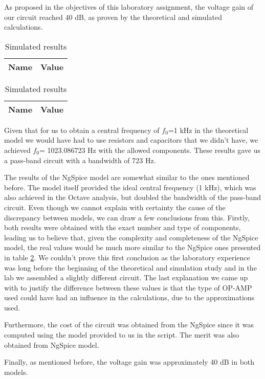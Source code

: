 As proposed in the objectives of this laboratory assignment, the voltage gain of our circuit reached 40 dB, as proven by the theoretical and simulated calculations. 

\begin{table}[H]
\parbox{.5\linewidth}{
\centering                
\def\arraystretch{1}        %

\begin{tabular}{c|c}        %
\hline                      %

\textbf{Name}  & \textbf{Value}\\     
\hline                      %

\hline                      %
\end{tabular}
\captionsetup{justification=justified, margin=0.5cm} 
\caption{Theoretical results}
\label{tab11}
}
\hfill
\parbox{.5\linewidth}{
\centering
\def\arraystretch{1}

\begin{tabular}{c|c}
\hline    
\textbf{Name} & \textbf{Value} \\ \hline

\hline
\end{tabular}
\captionsetup{justification=justified, margin=0.5cm} 
\caption{Simulated results}
\label{tab12}
}
\end{table}



Given that for us to obtain a central frequency of $f_0$=1 kHz in the theoretical model we would have had to use resistors and capacitors that we didn't have, we achieved $f_0$= 1023.086723 Hz with the allowed components. These results gave us a pass-band circuit with a bandwidth of 723 Hz.

The results of the NgSpice \cite{bib:ngspice} model are somewhat similar to the ones mentioned before. The model itself provided the ideal central frequency (1 kHz), which was also achieved in the Octave \cite{bib:octave} analysis, but doubled the bandwidth of the pass-band circuit. Even though we cannot explain with certainty the cause of the discrepancy between models, we can draw a few conclusions from this. Firstly, both results were obtained with the exact number and type of components, leading us to believe that, given the complexity  and completeness of the NgSpice model, the real values would be much more similar to the NgSpice ones presented in table \ref{tab12}. We couldn't prove this first conclusion as the laboratory experience was long before the beginning of the theoretical and simulation study and in the lab we assembled a slightly different circuit. The last explanation we came up with to justify the difference between these values is that the type of OP-AMP used could have had an influence in the calculations, due to the approximations used. 

Furthermore, the cost of the circuit was obtained from the NgSpice since it was computed using the model provided to us in the script. The merit was also obtained from NgSpice model. 

Finally, as mentioned before, the voltage gain was approximately 40 dB in both models. 
